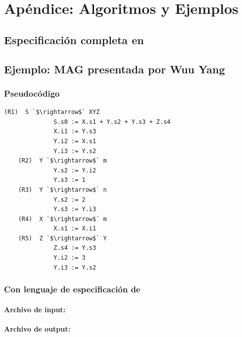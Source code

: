 \chapter{Apéndice: Algoritmos y Ejemplos}
\label{chap:appendix}

\section{Especificación completa en \spirit}
\label{append:grammarspirit}



\section{Ejemplo: MAG presentada por Wuu Yang}
\label{append:agwuuyang}

\subsection{Pseudocódigo}
\begin{lstlisting}[backgroundcolor=\color{white}]
    (R1)  S `$\rightarrow$` XYZ
              S.s0 := X.s1 + Y.s2 + Y.s3 + Z.s4
              X.i1 := Y.s3
              Y.i2 := X.s1
              Y.i3 := Y.s2
    (R2)  Y `$\rightarrow$` m
              Y.s2 := Y.i2
              Y.s3 := 1
    (R3)  Y `$\rightarrow$` n
              Y.s2 := 2
              Y.s3 := Y.i3
    (R4)  X `$\rightarrow$` m
              X.s1 := X.i1
    (R5)  Z `$\rightarrow$` Y
              Z.s4 := Y.s3
              Y.i2 := 3
              Y.i3 := Y.s2
\end{lstlisting} 

\subsection{Con lenguaje de especificación de \maggen}

\subsubsection{Archivo de input: }


\subsubsection{Archivo de output: }


